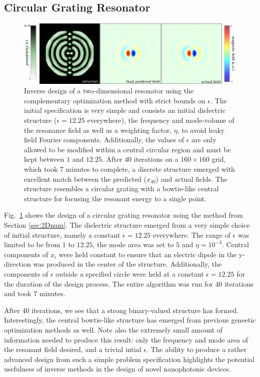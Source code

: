 \subsection{Circular Grating Resonator}
\begin{figure}[htbp]\centering
\includegraphics[width=\textwidth]{p1/circle}
\caption{Inverse design of a two-dimensional resonator using the complementary optimization method with strict bounds on $\epsilon$. The initial specification is very simple and consists an initial dielectric structure ($\epsilon=12.25$ everywhere), the frequency and mode-volume of the resonance field as well as a weighting factor, $\eta$, to avoid leaky field Fourier components. Additionally, the values of $\epsilon$ are only allowed to be modified within a central circular region and must be kept between $1$ and $12.25$. After $40$ iterations on a $160 \times 160$ grid, which took $7$ minutes to complete, a discrete structure emerged with excellent match between the predicted ($x_{40}$) and actual fields. The structure resembles a circular grating with a bowtie-like central structure for focusing the resonant energy to a single point.} 
\label{circle pic}
\end{figure}
Fig.~\ref{circle pic} shows the design of a circular grating resonator using the method from Section \ref{sec:2Dnum}. The dielectric structure emerged from a very simple choice of initial structure, namely a constant $\epsilon=12.25$ everywhere. The range of $\epsilon$ was limited to be from $1$ to $12.25$, the mode area was set to $5$ and $\eta= 10^{-3}$. Central components of $x_i$ were held constant to ensure that an electric dipole in the y-direction was produced in the center of the structure. Additionally, the components of $\epsilon$ outside a specified circle were held at a constant $\epsilon=12.25$ for the duration of the design process. The entire algorithm was run for $40$ iterations and took $7$ minutes.

After $40$ iterations, we see that a strong binary-valued structure has formed. Interestingly, the central bowtie-like structure has emerged from previous geneetic optimization methods as well\cite{Lip08}. Note also the extremely small amount of information needed to produce this result: only the frequency and mode area of the resonant field desired, and a trivial intial $\epsilon$. The ability to produce a rather advanced design from such a simple problem specification highlights the potential usefulness of inverse methods in the design of novel nanophotonic devices.

